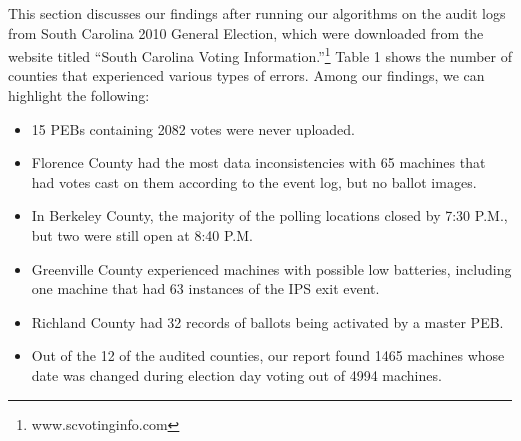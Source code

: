 \smvertspace
This section discusses our findings after running our algorithms on
the audit logs from South Carolina 2010 General Election, which were downloaded from the website
titled \textquotedblleft South Carolina Voting
Information.\textquotedblright \footnote{www.scvotinginfo.com} Table 1 shows the number of counties that experienced various types of errors.  Among our findings, we can highlight the following:
\smvertspace
\begin{itemize}
\item 15 PEBs containing 2082 votes were never uploaded.
\item Florence County had the most data inconsistencies with 65 machines that had votes cast on them according to the event log, but no ballot images.
\item In Berkeley County, the majority of the polling locations closed by 7:30 P.M., but two were still open at 8:40 P.M.
\item Greenville County experienced machines with possible low batteries, including one machine that had 63 instances of the IPS exit event.
\item Richland County had 32 records of ballots being activated by a master PEB.   
\item Out of the 12 of the audited counties, our report found 1465 machines whose date was changed during election day voting out of 4994 machines.
\end{itemize}

